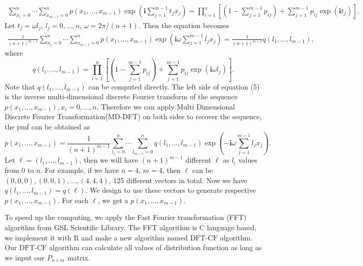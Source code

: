 \documentclass[12pt]{article}
\newcommand{\ivec}{{\boldsymbol{i}}}
\newcommand{\dft}{{\textrm{DFT-CF}}}
\begin{document}
\begin{align*}
\sum_{x_1 = 0}^{n}\cdots \sum_{x_{m-1} = 0}^n p(x_1,\ldots,x_{m-1})\exp\left(\ivec\sum_{j=1}^{m-1}t_jx_j\right)= \prod_{i=1}^{n}\left[(1 - \sum_{j=1}^{m-1}p_{ij})+\sum_{j=1}^{m-1}p_{ij}\exp(\ivec t_j)\right].
\end{align*}
Let $t_j = \omega l_j$, $l_j = 0, \ldots, n$, $\omega = 2\pi/(n+1)$. Then the equation becomes
\begin{align}
\frac{1}{(n+1)^{m-1}} \sum_{x_1 = 0}^{n}\cdots \sum_{x_{m-1} = 0}^n p(x_1,\ldots,x_{m-1}) \exp\left(\ivec\omega\sum_{j=1}^{m-1}l_j x_j\right)= \frac{1}{(n+1)^{m-1}} q(l_1, \ldots, l_{m-1}),
\end{align}
where
$$ q(l_1, \ldots, l_{m-1})=\prod_{i=1}^{n}\left[(1 - \sum_{j=1}^{m-1}p_{ij})+\sum_{j=1}^{m-1}p_{ij}\exp(\ivec \omega l_j)\right].$$	
Note that $q(l_1, \ldots, l_{m-1})$ can be computed directly. The left side of equation (5) is the inverse multi-dimensional discrete Fourier transform of the sequence $ p(x_1,\ldots,x_{m-1}), x_i = 0 , \dots, n$. Therefore we can apply Multi Dimensional Discrete Fourier Transformation(MD-DFT) on both sides to recover the sequence, the pmf can be obtained as
\begin{equation}
p(x_1, \ldots, x_{m-1}) = \frac{1}{(n+1)^{m-1}}\sum_{l_1 = 0}^{n}\cdots \sum_{l_{m-1} = 0}^n q(l_1, \ldots, l_{m-1}) \exp\left(-\ivec\omega\sum_{j=1}^{m-1}l_j x_j\right).
\end{equation}
Let $\ell = (l_1,\dots,l_{m-1})$, then we will have $(n
+1)^{m-1}$ different $\ell$ as $l_i$ values from $0$ to $n$. For example, if we have $n=4$, $m=4$, then $\ell$ can be $(0, 0, 0), (0, 0, 1), \dots, (4, 4, 4)$, 125 different vectors in total. Now we have $q(l_1,\dots,l_{m-1}) = q(\ell)$. We design to use these vectors to generate respective $p(x_1,\dots,x_{m-1})$. For each $\ell$, we get a $p(x_1,\dots,x_{m-1})$.

To speed up the computing, we apply the Fast Fourier transformation (FFT) algorithm  from GSL Scientific Library. The FFT algorithm is C language based, we implement it with R and make a new algorithm named $\dft$ algorithm. Our $\dft$ algorithm can calculate all values of distribution function as long as we input our $P_{n \times m}$ matrix.



\end{document}

